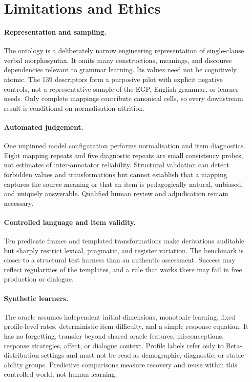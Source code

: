 \section{Limitations and Ethics}
\label{sec:limitations}

\paragraph{Representation and sampling.}
The ontology is a deliberately narrow engineering representation of
single-clause verbal morphosyntax.  It omits many constructions, meanings, and
discourse dependencies relevant to grammar learning.  Its values need not be
cognitively atomic.  The 139 descriptors form a purposive pilot with explicit
negative controls, not a representative sample of the EGP, English grammar,
or learner needs.  Only complete mappings contribute canonical cells, so every
downstream result is conditional on normalisation attrition.

\paragraph{Automated judgement.}
One unpinned model configuration performs normalisation and item diagnostics.
Eight mapping repeats and five diagnostic repeats are small consistency probes,
not estimates of inter-annotator reliability.  Structural validation can
detect forbidden values and transformations but cannot establish that a
mapping captures the source meaning or that an item is pedagogically natural,
unbiased, and uniquely answerable.  Qualified human review and adjudication
remain necessary.

\paragraph{Controlled language and item validity.}
Ten predicate frames and templated transformations make derivations auditable
but sharply restrict lexical, pragmatic, and register variation.  The
benchmark is closer to a structural test harness than an authentic assessment.
Success may reflect regularities of the templates, and a rule that works there
may fail in free production or dialogue.

\paragraph{Synthetic learners.}
The oracle assumes independent initial dimensions, monotonic learning, fixed
profile-level rates, deterministic item difficulty, and a simple response
equation.  It has no forgetting, transfer beyond shared oracle features,
misconceptions, response strategies, affect, or dialogue context.  Profile
labels refer only to Beta-distribution settings and must not be read as
demographic, diagnostic, or stable ability groups.  Predictive comparisons
measure recovery and reuse within this controlled world, not human learning.

